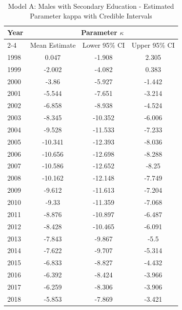 \begin{landscape}
\begin{table}[htbp]
\centering
\caption{Model A: Males with Secondary Education - Estimated Parameter kappa  with Credible Intervals}
\label{tab:parameters_k7}
\begin{tabular}{@{}lccc@{}}
\toprule
Year & \multicolumn{3}{c}{Parameter \(\kappa\)} \\
\cmidrule(lr){2-4}
      & Mean Estimate & Lower 95\% CI & Upper 95\% CI \\
\midrule
1998 & 0.047 & -1.908 & 2.305 \\
1999 & -2.002 & -4.082 & 0.383 \\
2000 & -3.86 & -5.927 & -1.442 \\
2001 & -5.544 & -7.651 & -3.214 \\
2002 & -6.858 & -8.938 & -4.524 \\
2003 & -8.345 & -10.352 & -6.006 \\
2004 & -9.528 & -11.533 & -7.233 \\
2005 & -10.341 & -12.393 & -8.036 \\
2006 & -10.656 & -12.698 & -8.288 \\
2007 & -10.586 & -12.652 & -8.25 \\
2008 & -10.162 & -12.148 & -7.749 \\
2009 & -9.612 & -11.613 & -7.204 \\
2010 & -9.33 & -11.359 & -7.068 \\
2011 & -8.876 & -10.897 & -6.487 \\
2012 & -8.428 & -10.465 & -6.091 \\
2013 & -7.843 & -9.867 & -5.5 \\
2014 & -7.622 & -9.707 & -5.314 \\
2015 & -6.833 & -8.827 & -4.432 \\
2016 & -6.392 & -8.424 & -3.966 \\
2017 & -6.259 & -8.306 & -3.906 \\
2018 & -5.853 & -7.869 & -3.421 \\
\bottomrule
\end{tabular}
\end{table}
\end{landscape}